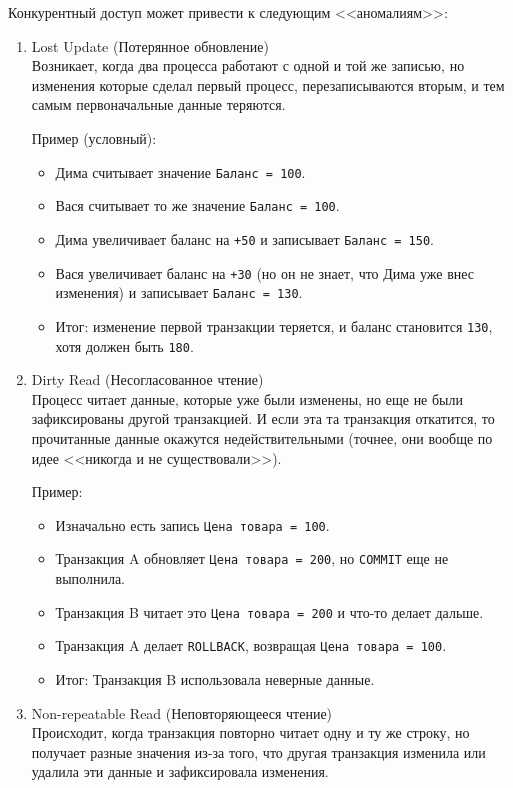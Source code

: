 Конкурентный доступ может привести к следующим <<аномалиям>>:
\begin{enumerate}
    \item Lost Update (Потерянное обновление) ~\\
    Возникает, когда два процесса работают с одной и той же записью, но изменения которые сделал первый процесс, перезаписываются вторым, и тем самым первоначальные данные теряются.
    
    Пример (условный):
    \begin{itemize}
        \item Дима считывает значение \texttt{Баланс = 100}.
        \item Вася считывает то же значение \texttt{Баланс = 100}.
        \item Дима увеличивает баланс на \texttt{+50} и записывает \texttt{Баланс = 150}.
        \item Вася увеличивает баланс на \texttt{+30} (но он не знает, что Дима уже внес изменения) и записывает \texttt{Баланс = 130}.
        \item Итог: изменение первой транзакции теряется, и баланс становится \texttt{130}, хотя должен быть \texttt{180}.
    \end{itemize}

    \item Dirty Read (Несогласованное чтение) ~\\
    Процесс читает данные, которые уже были изменены, но еще не были зафиксированы другой транзакцией. И если эта та транзакция откатится, то прочитанные данные окажутся недействительными (точнее, они вообще по идее <<никогда и не существовали>>).
    
    Пример:
    \begin{itemize}
        \item Изначально есть запись \texttt{Цена товара = 100}.
        \item Транзакция A обновляет \texttt{Цена товара = 200}, но \texttt{COMMIT} еще не выполнила.
        \item Транзакция B читает это \texttt{Цена товара = 200} и что-то делает дальше.
        \item Транзакция A делает \texttt{ROLLBACK}, возвращая \texttt{Цена товара = 100}.
        \item Итог: Транзакция B использовала неверные данные.
    \end{itemize}

    \item Non-repeatable Read (Неповторяющееся чтение) ~\\
    Происходит, когда транзакция повторно читает одну и ту же строку, но получает разные значения из-за того, что другая транзакция изменила или удалила эти данные и зафиксировала изменения.


\end{enumerate}

